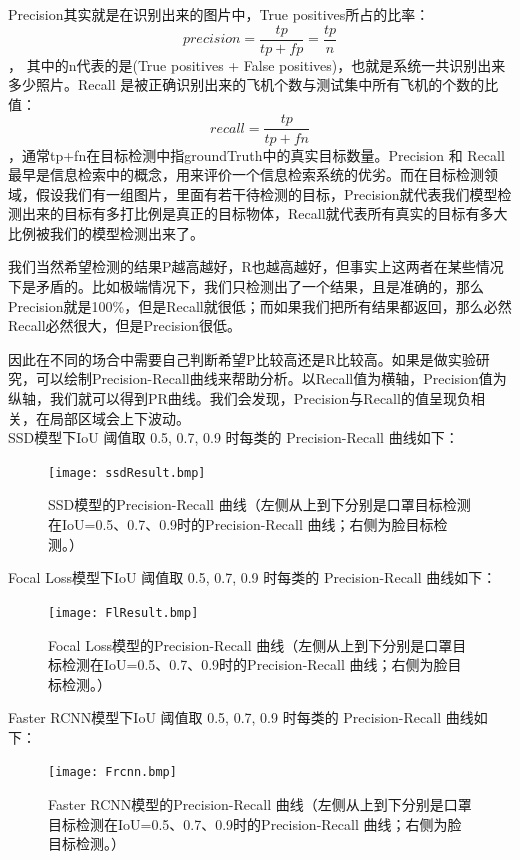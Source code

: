 \documentclass[journal,transmag]{IEEEtran}
\begin{document}
Precision其实就是在识别出来的图片中，True positives所占的比率：$$precision=\frac{t p}{t p+f p}=\frac{t p}{n}$$，
其中的n代表的是(True positives + False positives)，也就是系统一共识别出来多少照片。Recall 是被正确识别出来的飞机个数与测试集中所有飞机的个数的比值：$$recall=\frac{t p}{t p+f n}$$，通常tp+fn在目标检测中指groundTruth中的真实目标数量。Precision 和 Recall最早是信息检索中的概念，用来评价一个信息检索系统的优劣。而在目标检测领域，假设我们有一组图片，里面有若干待检测的目标，Precision就代表我们模型检测出来的目标有多打比例是真正的目标物体，Recall就代表所有真实的目标有多大比例被我们的模型检测出来了。

我们当然希望检测的结果P越高越好，R也越高越好，但事实上这两者在某些情况下是矛盾的。比如极端情况下，我们只检测出了一个结果，且是准确的，那么Precision就是100\%，但是Recall就很低；而如果我们把所有结果都返回，那么必然Recall必然很大，但是Precision很低。

因此在不同的场合中需要自己判断希望P比较高还是R比较高。如果是做实验研究，可以绘制Precision-Recall曲线来帮助分析。以Recall值为横轴，Precision值为纵轴，我们就可以得到PR曲线。我们会发现，Precision与Recall的值呈现负相关，在局部区域会上下波动。\\

SSD模型下IoU 阈值取 0.5, 0.7, 0.9 时每类的 Precision-Recall 曲线如下：
\begin{figure}[h]
\centering
\texttt{[image: ssdResult.bmp]}
\caption{SSD模型的Precision-Recall 曲线（左侧从上到下分别是口罩目标检测在IoU=0.5、0.7、0.9时的Precision-Recall 曲线；右侧为脸目标检测。）}
\end{figure}

Focal Loss模型下IoU 阈值取 0.5, 0.7, 0.9 时每类的 Precision-Recall 曲线如下：

\begin{figure}[h]
\centering
\texttt{[image: FlResult.bmp]}
\caption{Focal Loss模型的Precision-Recall 曲线（左侧从上到下分别是口罩目标检测在IoU=0.5、0.7、0.9时的Precision-Recall 曲线；右侧为脸目标检测。）}
\end{figure}

Faster RCNN模型下IoU 阈值取 0.5, 0.7, 0.9 时每类的 Precision-Recall 曲线如下：

\begin{figure}[h]
\centering
\texttt{[image: Frcnn.bmp]}
\caption{Faster RCNN模型的Precision-Recall 曲线（左侧从上到下分别是口罩目标检测在IoU=0.5、0.7、0.9时的Precision-Recall 曲线；右侧为脸目标检测。）}
\end{figure}
\end{document}
